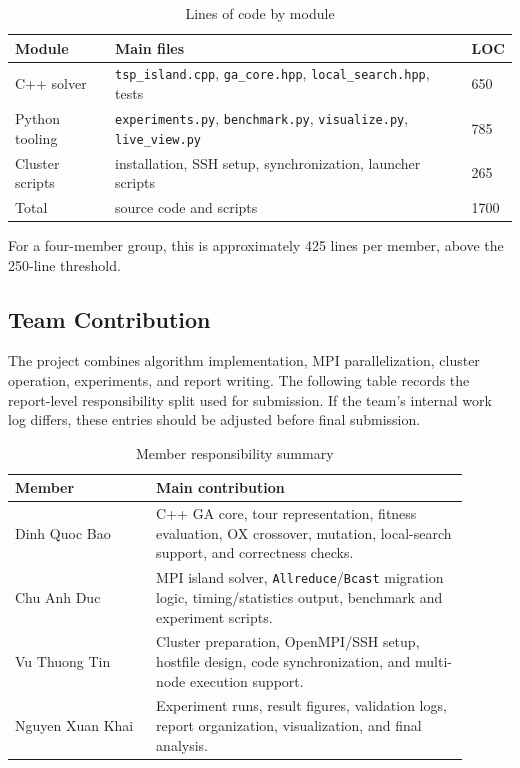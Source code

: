 \documentclass[11pt,a4paper]{article}
\begin{document}
\begin{table}[H]
\centering
\caption{Lines of code by module}
\begin{tabular}{lll}
\toprule
Module & Main files & LOC \\
\midrule
C++ solver & \texttt{tsp\_island.cpp}, \texttt{ga\_core.hpp}, \texttt{local\_search.hpp}, tests & 650 \\
Python tooling & \texttt{experiments.py}, \texttt{benchmark.py}, \texttt{visualize.py}, \texttt{live\_view.py} & 785 \\
Cluster scripts & installation, SSH setup, synchronization, launcher scripts & 265 \\
\midrule
Total & source code and scripts & 1700 \\
\bottomrule
\end{tabular}
\end{table}

For a four-member group, this is approximately 425 lines per member, above the
250-line threshold.

\subsection{Team Contribution}
The project combines algorithm implementation, MPI parallelization, cluster
operation, experiments, and report writing. The following table records the
report-level responsibility split used for submission. If the team's internal
work log differs, these entries should be adjusted before final submission.

\begin{table}[H]
\centering
\caption{Member responsibility summary}
\begin{tabular}{p{0.28\linewidth}p{0.62\linewidth}}
\toprule
Member & Main contribution \\
\midrule
Dinh Quoc Bao & C++ GA core, tour representation, fitness evaluation, OX crossover, mutation, local-search support, and correctness checks. \\
Chu Anh Duc & MPI island solver, \texttt{Allreduce}/\texttt{Bcast} migration logic, timing/statistics output, benchmark and experiment scripts. \\
Vu Thuong Tin & Cluster preparation, OpenMPI/SSH setup, hostfile design, code synchronization, and multi-node execution support. \\
Nguyen Xuan Khai & Experiment runs, result figures, validation logs, report organization, visualization, and final analysis. \\
\bottomrule
\end{tabular}
\end{table}
\end{document}
